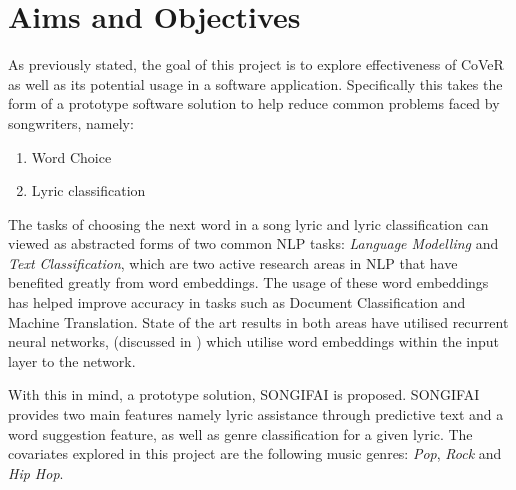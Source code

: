 \section{Aims and Objectives}
\noindent
\newline
As previously stated, the goal of this project is to explore effectiveness of CoVeR as well as its potential usage in a software application. Specifically this takes the form of a prototype software solution to help reduce common problems faced by songwriters, namely:

\begin{enumerate}
	\item Word Choice 
	\item Lyric classification
\end{enumerate}

\noindent
\newline
The tasks of choosing the next word in a song lyric and lyric classification can viewed as abstracted forms of two common NLP tasks: \textit{Language Modelling} and \textit{Text Classification}, which are two active research areas in NLP that have benefited greatly from word embeddings. The usage of these word embeddings has helped improve accuracy in tasks such as Document Classification and Machine Translation. State of the art results in both areas have utilised recurrent neural networks, (discussed in ) which utilise word embeddings within the input layer to the network.

\noindent
\newline
With this in mind, a prototype solution, SONGIFAI is proposed. SONGIFAI provides two main features namely lyric assistance through predictive text and a word suggestion feature, as well as genre classification for a given lyric. The covariates explored in this project are the following music genres: \textit{Pop}, \textit{Rock} and \textit{Hip Hop}. 

